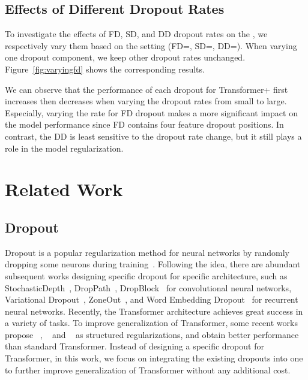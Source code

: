 \documentclass[11pt]{article}
\begin{document}
\subsection{Effects of Different Dropout Rates}

To investigate the effects of FD, SD, and DD dropout rates on the , we respectively vary them based on the setting (FD=, SD=, DD=). When varying one dropout component, we keep other dropout rates unchanged. Figure~\ref{fig:varyingfd} shows the corresponding results.

We can observe that the performance of each dropout for Transformer+ first increases then decreases when varying the dropout rates from small to large. Especially, varying the rate for FD dropout makes a more significant impact on the model performance since FD contains four feature dropout positions. In contrast, the DD is least sensitive to the dropout rate change, but it still plays a role in the model regularization. 


\section{Related Work}

\subsection{Dropout}
Dropout is a popular regularization method for neural networks by randomly dropping some neurons during training~\cite{srivastava2014dropout}. Following the idea, there are abundant subsequent works designing specific dropout for specific architecture, such as StochasticDepth~\cite{DBLP:conf/eccv/HuangSLSW16}, DropPath~\cite{DBLP:conf/iclr/LarssonMS17}, DropBlock~\cite{DBLP:conf/nips/GhiasiLL18} for convolutional neural networks, Variational Dropout~\cite{DBLP:conf/nips/GalG16}, ZoneOut~\cite{DBLP:conf/iclr/KruegerMKPBKGBC17}, and Word Embedding Dropout~\cite{DBLP:conf/nips/GalG16} for recurrent neural networks. Recently, the Transformer architecture achieves great success in a variety of tasks. To improve generalization of Transformer, some recent works propose ~\cite{fan2019reducing}, ~\cite{zhou2020scheduled} and ~\cite{DBLP:journals/corr/abs-2009-09672} as structured regularizations, and obtain better performance than standard Transformer. Instead of designing a specific dropout for Transformer, in this work, we focus on integrating the existing dropouts into one  to further improve generalization of Transformer without any additional cost.
\end{document}
